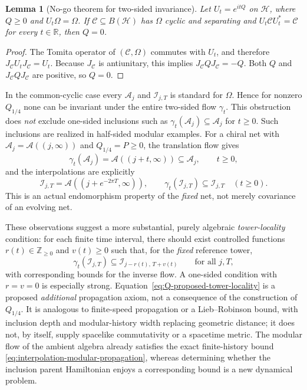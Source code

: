 \documentclass[a4paper,11pt]{article}
\newtheorem{lemma}[theorem]{Lemma}
\theoremstyle{definition}
\newcommand{\mA}{\mathcal{A}}
\newcommand{\mI}{\mathcal{I}}
\newcommand{\mH}{\mathcal{H}}
\begin{document}
\begin{lemma}[No-go theorem for two-sided invariance]
\label{lem:Q-fixed-standard-no-go}
Let $U_t=e^{itQ}$ on $\mH$, where $Q\geq0$ and
$U_t\Omega=\Omega$. If $\mathcal C\subseteq B(\mH)$ has
$\Omega$ cyclic and separating and
$U_t\mathcal C U_t^*=\mathcal C$ for every $t\in\mathbb R$,
then $Q=0$.
\end{lemma}
\begin{proof}
The Tomita operator of $(\mathcal C,\Omega)$ commutes with
$U_t$, and therefore $J_{\mathcal C}U_tJ_{\mathcal C}=U_t$.
Because $J_{\mathcal C}$ is antiunitary, this implies
$J_{\mathcal C}QJ_{\mathcal C}=-Q$. Both $Q$ and
$J_{\mathcal C}QJ_{\mathcal C}$ are positive, so $Q=0$.
\end{proof}

In the common-cyclic case every $\mA_j$ and $\mI_{j,T}$ is
standard for $\Omega$. Hence for nonzero $Q_{1/4}$ none can be
invariant under the entire two-sided flow $\gamma_t$.
This obstruction does \emph{not} exclude one-sided inclusions such
as $\gamma_t(\mA_j)\subseteq\mA_j$ for $t\geq0$.
Such inclusions are realized in half-sided modular examples.
For a chiral net with $\mA_j=\mathcal A((j,\infty))$ and
$Q_{1/4}=P\geq0$, the translation flow gives
\begin{equation}
 \gamma_t(\mA_j)=\mathcal A((j+t,\infty))
 \subseteq\mA_j,\qquad t\geq0,
 \label{eq:Q-half-sided-tower-locality}
\end{equation}
and the interpolations are explicitly
\begin{equation}
 \mI_{j,T}=\mathcal A((j+e^{-2\pi T},\infty)),\qquad
 \gamma_t(\mI_{j,T})\subseteq\mI_{j,T}\quad(t\geq0).
 \label{eq:Q-half-sided-interpolation-locality}
\end{equation}
This is an actual endomorphism property of the \emph{fixed}
net, not merely covariance of an evolving net.

These observations suggest a more substantial, purely algebraic
\emph{tower-locality} condition: for each finite time interval,
there should exist controlled functions $r(t)\in\mathbb Z_{\geq0}$
and $v(t)\geq0$ such that, for the \emph{fixed} reference tower,
\begin{equation}
 \gamma_t(\mI_{j,T})
 \subseteq\mI_{j-r(t),\,T+v(t)}
 \qquad\text{for all }j,T,
 \label{eq:Q-proposed-tower-locality}
\end{equation}
with corresponding bounds for the inverse flow.
A one-sided condition with $r=v=0$ is especially strong.
Equation~\eqref{eq:Q-proposed-tower-locality} is a proposed
\emph{additional} propagation axiom, not a consequence of the
construction of $Q_{1/4}$. It is analogous to finite-speed
propagation or a Lieb--Robinson bound, with inclusion depth and
modular-history width replacing geometric distance; it does not,
by itself, supply spacelike commutativity or a spacetime metric.
The modular flow of the ambient algebra already satisfies the
exact finite-history bound
\eqref{eq:interpolation-modular-propagation}, whereas determining
whether the inclusion parent Hamiltonian enjoys a corresponding
bound is a new dynamical problem.
\end{document}
